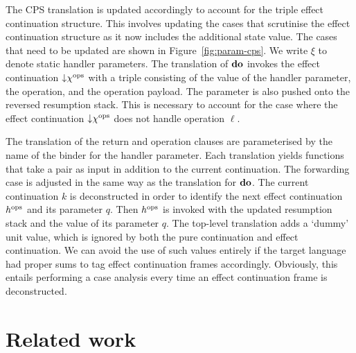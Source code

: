 \documentclass[12pt,phd,lfcs,twoside,openright,logo,leftchapter,normalheadings]{infthesis}
\theoremstyle{plain}
\theoremstyle{definition}
\begin{document}
The CPS translation is updated accordingly to account for the triple
effect continuation structure. This involves updating the cases that
scrutinise the effect continuation structure as it now includes the
additional state value. The cases that need to be updated are shown in
Figure~\ref{fig:param-cps}. We write $\xi$ to denote static handler
parameters.
%
The translation of $\mathbf{do}$ invokes the effect continuation
$\mathord{\downarrow} \chi^{\mathrm{ops}}$ with a triple consisting of the value of the handler
parameter, the operation, and the operation payload. The parameter is
also pushed onto the reversed resumption stack. This is necessary to
account for the case where the effect continuation $\mathord{\downarrow} \chi^{\mathrm{ops}}$
does not handle operation $\ell$.
%

The translation of the return and operation clauses are parameterised
by the name of the binder for the handler parameter. Each translation
yields functions that take a pair as input in addition to the current
continuation. The forwarding case is adjusted in the same way as the
translation for $\mathbf{do}$. The current continuation $k$ is deconstructed
in order to identify the next effect continuation $h^{\mathrm{ops}}$ and its
parameter $q$. Then $h^{\mathrm{ops}}$ is invoked with the updated resumption
stack and the value of its parameter $q$.
%
The top-level translation adds a `dummy' unit value, which is ignored
by both the pure continuation and effect continuation.%
We can avoid the use of such values entirely if the target language
had proper sums to tag effect continuation frames
accordingly. Obviously, this entails performing a case analysis every
time an effect continuation frame is deconstructed.

\section{Related work}
\label{sec:cps-related-work}
\end{document}
